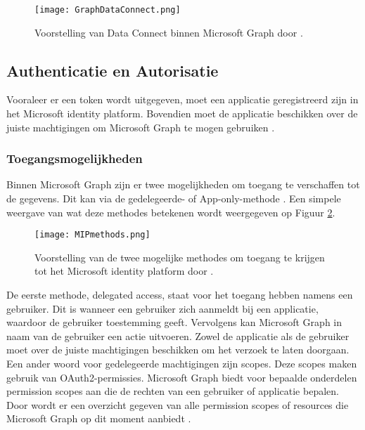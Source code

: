 \begin{figure}[!h]
    \texttt{[image: GraphDataConnect.png]}
    \caption[Voorbeeld Microsoft Graph Data Connect]{Voorstelling van Data Connect binnen Microsoft Graph door \textcite{Microsoft2022c}.}
    \label{MSGDC}
\end{figure}



\subsection{Authenticatie en Autorisatie}


Vooraleer er een token wordt uitgegeven, moet een applicatie geregistreerd zijn in het Microsoft identity platform. Bovendien moet de applicatie beschikken over de juiste machtigingen om Microsoft Graph te mogen gebruiken \autocite{Microsoft2022b}.

\subsubsection{Toegangsmogelijkheden}


Binnen Microsoft Graph zijn er twee mogelijkheden om toegang te verschaffen tot de gegevens. Dit kan via de gedelegeerde- of App-only-methode \autocite{Microsoft2022b}. Een simpele weergave van wat deze methodes betekenen wordt weergegeven op Figuur \ref{MIPM}. \\

\begin{figure}[h]
    \texttt{[image: MIPmethods.png]}
    \caption[Voorbeeld toegangsmogelijkheden Microsoft Graph]{Voorstelling van de twee mogelijke methodes om toegang te krijgen tot het Microsoft identity platform door \autocite{Microsoft2022b}.}
    \label{MIPM}
\end{figure}

De eerste methode, delegated access, staat voor het toegang hebben namens een gebruiker. Dit is wanneer een gebruiker zich aanmeldt bij een applicatie, waardoor de gebruiker toestemming geeft. Vervolgens kan Microsoft Graph in naam van de gebruiker een actie uitvoeren. Zowel de applicatie als de gebruiker moet over de juiste machtigingen beschikken om het verzoek te laten doorgaan. Een ander woord voor gedelegeerde machtigingen zijn scopes. Deze scopes maken gebruik van OAuth2-permissies. Microsoft Graph biedt voor bepaalde onderdelen permission scopes aan die de rechten van een gebruiker of applicatie bepalen. Door \textcite{Microsoft2023p} wordt er een overzicht gegeven van alle permission scopes of resources die Microsoft Graph op dit moment aanbiedt \autocite{Microsoft2022b}. \\

